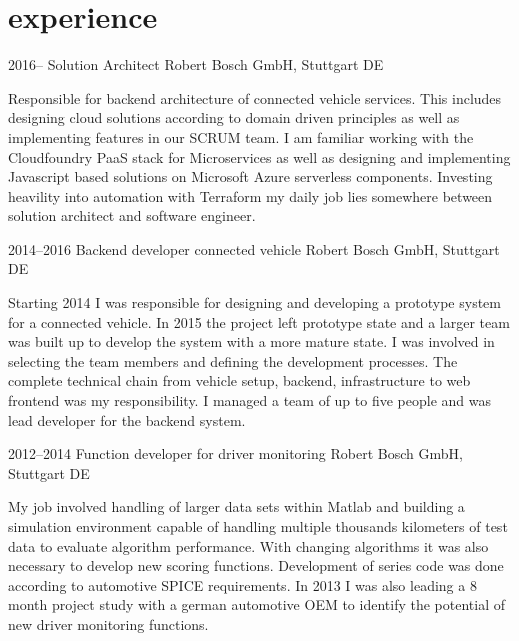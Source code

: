 \documentclass[]{friggeri-cv} %
\begin{document}

\section{\color{orange}experience}

\begin{entrylist}


\entry
{2016--}
{Solution Architect}
{Robert Bosch GmbH, Stuttgart DE}
{Responsible for backend architecture of connected vehicle services. This includes designing cloud solutions according to domain driven principles as well as implementing features in our SCRUM team. I am familiar working with the Cloudfoundry PaaS stack for Microservices as well as designing and implementing Javascript based solutions on Microsoft Azure serverless components. Investing heavility into automation with Terraform my daily job lies somewhere between solution architect and software engineer.

}
\end{entrylist}
\begin{entrylist}
\entry
{2014--2016}
{Backend developer connected vehicle}
{Robert Bosch GmbH, Stuttgart DE}
{Starting 2014 I was responsible for designing and developing a prototype system for a connected vehicle. In 2015 the project left prototype state and a larger team was built up to develop the system with a more mature state. I was involved in selecting the team members and defining the development processes. The complete technical chain from vehicle setup, backend, infrastructure to web frontend was my responsibility. I managed a team of up to five people and was lead developer for the backend system. 

}
\end{entrylist}
\begin{entrylist}
\entry
{2012--2014}
{Function developer for driver monitoring}
{Robert Bosch GmbH, Stuttgart DE}
{My job involved handling of larger data sets within Matlab and building a simulation environment capable of handling multiple thousands kilometers of test data to evaluate algorithm performance. With changing algorithms it was also necessary to develop new scoring functions. Development of series code was done according to automotive SPICE requirements. In 2013 I was also leading a 8 month project study with a german automotive OEM to identify the potential of new driver monitoring functions.

}
\end{entrylist}
\end{document}
